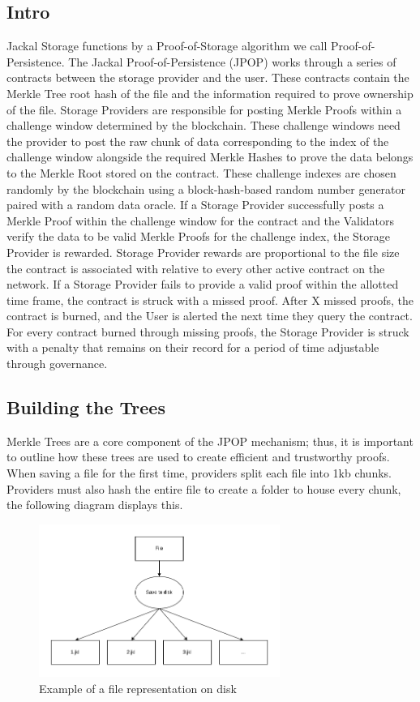 \documentclass[a4paper]{article}
\begin{document}
\subsection{Intro}
Jackal Storage functions by a Proof-of-Storage algorithm we call Proof-of-Persistence. The Jackal Proof-of-Persistence (JPOP) works through a series of contracts between the storage provider and the user. These contracts contain the Merkle Tree root hash of the file and the information required to prove ownership of the file. Storage Providers are responsible for posting Merkle Proofs within a challenge window determined by the blockchain. These challenge windows need the provider to post the raw chunk of data corresponding to the index of the challenge window alongside the required Merkle Hashes to prove the data belongs to the Merkle Root stored on the contract. These challenge indexes are chosen randomly by the blockchain using a block-hash-based random number generator paired with a random data oracle.
If a Storage Provider successfully posts a Merkle Proof within the challenge window for the contract and the Validators verify the data to be valid Merkle Proofs for the challenge index, the Storage Provider is rewarded. Storage Provider rewards are proportional to the file size the contract is associated with relative to every other active contract on the network. If a Storage Provider fails to provide a valid proof within the allotted time frame, the contract is struck with a missed proof. After X missed proofs, the contract is burned, and the User is alerted the next time they query the contract. For every contract burned through missing proofs, the Storage Provider is struck with a penalty that remains on their record for a period of time adjustable through governance.
\subsection{Building the Trees}
Merkle Trees are a core component of the JPOP mechanism; thus, it is important to outline how these trees are used to create efficient and trustworthy proofs. When saving a file for the first time, providers split each file into 1kb chunks. Providers must also hash the entire file to create a folder to house every chunk, the following diagram displays this.
\begin{figure}[!htbp]
\centering
\includegraphics[width=0.7\textwidth]{assets/tree1.png}
\caption{Example of a file representation on disk}
\end{figure}
\end{document}
